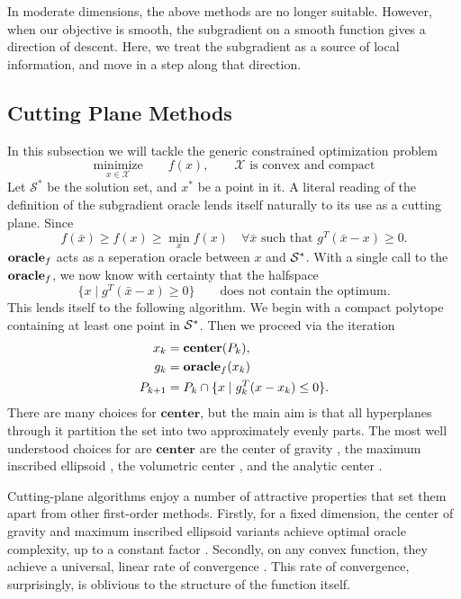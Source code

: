In moderate dimensions, the above methods are no longer suitable. However,
when our objective is smooth, the subgradient on a smooth function gives a
direction of descent. Here, we treat the subgradient as a source of local
information, and move in a step along that direction.

\subsection{Cutting Plane Methods} In this subsection we will tackle the 
generic constrained optimization problem
$$
\underset{x \in \mathcal{X}}{\mbox{minimize}}\qquad f(x), \qquad \mathcal{X} \mbox{ is convex and compact}
$$
Let $\mathcal{S}^*$ be the solution set, and $x^*$ be a point in it. A literal reading of the definition of the subgradient oracle lends itself naturally to its use as a cutting plane. Since
\[
f(\bar{x}) \geq f(x) \geq \min_x f(x)
	\quad\forall \mbox{$\bar{x}$ such that ${g^T}{(\bar{x}-x)}\geq 0$}.
\]
$\mbox{\bf oracle}_f$ acts as a seperation oracle between $x$ and $\mathcal{S^*}$.
With a single call to the $\mbox{\bf oracle}_f$, we now know with 
certainty that the halfspace
$$\{ x \mid {g^T}{(\bar{x}-x)}\geq 0 \} \qquad \mbox{does not contain
the optimum.}$$ 
This lends itself to the following algorithm. We begin with a compact
polytope containing at least one point in $\mathcal{S^*}$. Then we proceed via
the iteration
\begin{align*}
  x_{k} & = \mathbf{center}(P_k), \\
  \quad g_k &= \mbox{\bf oracle}_f(x_k)
\\P_{k+1} & = P_k \cap \{x \mid g_k^T(x -x_k) \leq 0 \}.
\end{align*}
There are many choices for $\mathbf{center}$, but the main aim is that all
hyperplanes through it partition the set into two approximately
evenly parts. The most well understood choices for are $\mathbf{center}$ are 
the center of gravity \cite{levin1965algorithm,newman1965location},
the maximum inscribed ellipsoid \cite{tarasov1988method}, the
volumetric center \cite{vaidya1989new}, and the analytic center
\cite{ye1996complexity}.

Cutting-plane algorithms enjoy a number of attractive properties that
set them apart from other first-order methods.  Firstly, for a fixed
dimension, the center of gravity and maximum inscribed ellipsoid
variants achieve optimal oracle complexity, up to a constant factor
\cite{nemirovski1994efficient}. Secondly, on any convex function, they
achieve a universal, linear rate of convergence
\cite{nemirovski1994efficient}. This rate of convergence,
surprisingly, is oblivious to the structure of the function itself.

